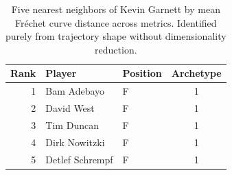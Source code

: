 \begin{table}[htbp]
  \centering\small
  \begin{tabular}{rllc}
    \toprule
    Rank & Player & Position & Archetype \\
    \midrule
    1 & Bam Adebayo & F & 1 \\
    2 & David West & F & 1 \\
    3 & Tim Duncan & F & 1 \\
    4 & Dirk Nowitzki & F & 1 \\
    5 & Detlef Schrempf & F & 1 \\
    \bottomrule
  \end{tabular}
  \caption{Five nearest neighbors of Kevin Garnett by mean Fr\'{e}chet curve distance across metrics. Identified purely from trajectory shape without dimensionality reduction.}
  \label{tab:Kevin_Garnett_frechet_curve_neighbors}
\end{table}

